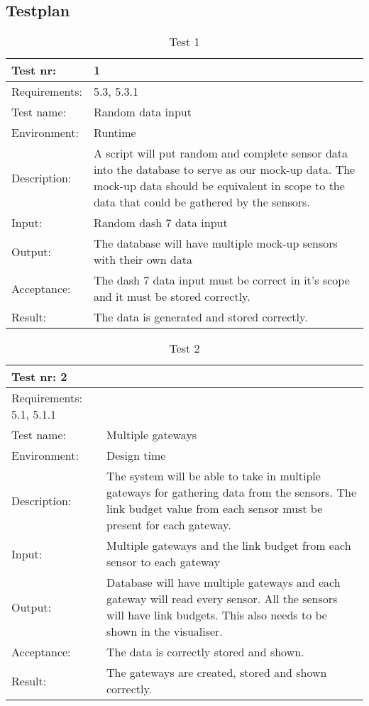 \documentclass[../document]{subfiles}
\begin{document}
\subsection{Testplan}

\begin{table}[H]
\caption{Test 1}
\centering
\begin{tabularx}{\textwidth}{|l|X|}
	\hline
	Test nr:
	&1
	\\ \hline Requirements:
	&5.3, 5.3.1
	\\ \hline Test name:
	&Random data input
	\\ \hline Environment:
	&Runtime
	\\ \hline Description:
	&A script will put random and complete sensor data into the database to serve as our mock-up data. The mock-up data should be equivalent in scope to the data that could be gathered by the sensors.
	\\ \hline Input:
	&Random dash 7 data input
	\\ \hline Output:
	&The database will have multiple mock-up sensors with their own data
	\\ \hline Acceptance:
	&The dash 7 data input must be correct in it’s scope and it must be stored correctly.
	\\ \hline Result:
	&The data is generated and stored correctly.	
	\\ \hline 
\end{tabularx}
\end{table}

\begin{table}[H]
\caption{Test 2}
\centering
\begin{tabularx}{\textwidth}{|l|X|}
\hline
Test nr:
2
\\ \hline Requirements:
5.1, 5.1.1
\\ \hline Test name:
&Multiple gateways
\\ \hline Environment:
&Design time
\\ \hline Description:
&The system will be able to take in multiple gateways for gathering data from the sensors. The link budget value from each sensor must be present for each gateway.
\\ \hline Input:
&Multiple gateways and the link budget from each sensor to each gateway
\\ \hline Output:
&Database will have multiple gateways and each gateway will read every sensor. All the sensors will have link budgets. This also needs to be shown in the visualiser.  
\\ \hline Acceptance:
&The data is correctly stored and shown.
\\ \hline Result:
&The gateways are created, stored and shown correctly.
\\ \hline 
\end{tabularx}
\end{table}
\end{document}
